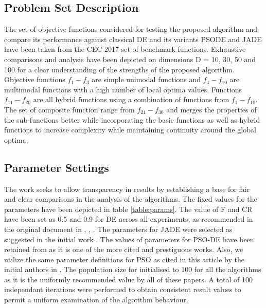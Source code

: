 \documentclass[a4paper,twoside]{article}
\begin{document}
\subsection{Problem Set Description}

The set of objective functions considered for testing the proposed algorithm and compare its performance against classical DE and its variants PSODE and JADE have been taken from the CEC 2017 set of benchmark functions. Exhaustive comparisons and analysis have been depicted on dimensions D = 10, 30, 50 and 100 for a clear understanding of the strengths of the proposed algorithm. Objective functions $f_1 - f_3$ are simple unimodal functions and $f_4 - f_{10}$ are multimodal functions with a high number of local optima values. Functions $f_{11} - f_{20}$ are all hybrid functions using a combination of functions from $f_1 - f_{10}$. The set of composite function range from $f_{21} - f_{30}$ and merges the properties of the sub-functions better while incorporating the basic functions as well as hybrid functions to increase complexity while maintaining continuity around the global optima.


\subsection{Parameter Settings}

The work seeks to allow transparency in results by establishing a base for fair and clear comparisons in the analysis of the algorithms. The fixed values for the parameters have been depicted in table \ref{table:params}. The value of F and CR have been set as 0.5 and 0.9 for DE across all experiments, as recommended in the original document in \cite{storn1995differential}, \cite{Mezura-Montes}, \cite{brest2006self}. The parameters for JADE were selected as suggested in the initial work \cite{zhang2009jade}. The values of parameters for PSO-DE have been retained from \cite{psodeLiu} as it is one of the more cited and prestiguous works. Also, we utilize the same parameter definitions for PSO as cited in this article by the initial authors in \cite{review07particleswarm}. The population size for initialised to 100 for all the algorithms as it is the uniformly recommended value by all of these papers. A total of 100 independant iterations were performed to obtain consistent result values to permit a uniform examination of the algorithm behaviour.
\end{document}
